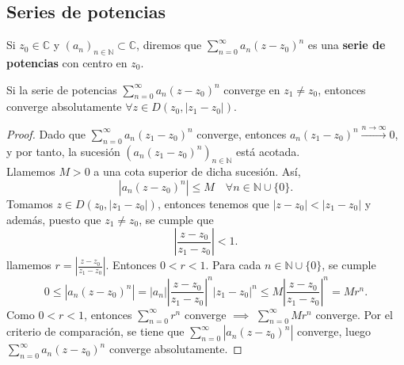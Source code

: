\subsection{Series de potencias}
\begin{definición} 
    Si $z_0 \in \mathbb{C}$ y $(a_n)_{n\in\mathbb{N}} \subset \mathbb{C}$, diremos que $\sum_{n=0}^{\infty} a_n (z - z_0)^n$ es una \textbf{serie de potencias} con centro en $z_0$.
\end{definición}


\begin{proposición}
    Si la serie de potencias $\sum_{n=0}^{\infty} a_n (z - z_0)^n$ converge en $z_1 \neq z_0$, entonces converge absolutamente $\forall z \in D(z_0, |z_1 - z_0|)$.
\end{proposición}

\begin{proof}
    Dado que $\sum_{n=0}^{\infty} a_n (z_1 - z_0)^n$ converge, entonces $a_n (z_1 - z_0)^n \xrightarrow{n\to\infty} 0$, y por tanto, la sucesión $(a_n (z_1 - z_0)^n)_{n\in\mathbb{N}}$ está acotada.\\
    Llamemos $M > 0$ a una cota superior de dicha sucesión. Así, 
    \[
        |a_n(z - z_0)^n| \leq M \quad \forall n \in \mathbb{N} \cup \{0\}.
    \]
    Tomamos $z \in D(z_0, |z_1 - z_0|)$, entonces tenemos que $|z - z_0| < |z_1 - z_0|$ y además, puesto que $z_1 \neq z_0$, se cumple que
    \[
        \left|\frac{z - z_0}{z_1 - z_0}\right| < 1.
    \]
    llamemos $r = \left|\frac{z - z_0}{z_1 - z_0}\right|$. Entonces $0 < r < 1$. Para cada $n \in \mathbb{N} \cup \{0\}$, se cumple
    \[
        0 \leq |a_n (z - z_0)^n| = |a_n| \left|\frac{z - z_0}{z_1 - z_0}\right|^n |z_1 - z_0|^n \leq M \left|\frac{z - z_0}{z_1 - z_0}\right|^n = M r^n.
    \]
    Como $0 < r < 1$, entonces $\sum_{n=0}^{\infty} r^n$ converge $\implies$ $\sum_{n=0}^{\infty} M r^n$ converge. Por el criterio de comparación, se tiene que $\sum_{n=0}^{\infty} |a_n (z - z_0)^n|$ converge, luego $\sum_{n=0}^{\infty} a_n (z - z_0)^n$ converge absolutamente. 
\end{proof}

